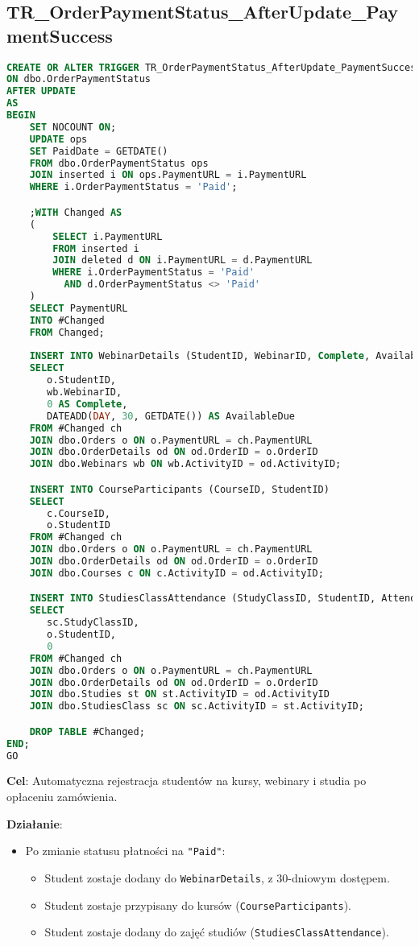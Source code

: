 \documentclass[12pt]{article}
\begin{document}
\newpage
\subsection{TR\_OrderPaymentStatus\_AfterUpdate\_PaymentSuccess}

\begin{lstlisting}[language=SQL]
CREATE OR ALTER TRIGGER TR_OrderPaymentStatus_AfterUpdate_PaymentSuccess
ON dbo.OrderPaymentStatus
AFTER UPDATE
AS
BEGIN
    SET NOCOUNT ON;
    UPDATE ops
    SET PaidDate = GETDATE()
    FROM dbo.OrderPaymentStatus ops
    JOIN inserted i ON ops.PaymentURL = i.PaymentURL
    WHERE i.OrderPaymentStatus = 'Paid';

    ;WITH Changed AS
    (
        SELECT i.PaymentURL
        FROM inserted i
        JOIN deleted d ON i.PaymentURL = d.PaymentURL
        WHERE i.OrderPaymentStatus = 'Paid'
          AND d.OrderPaymentStatus <> 'Paid'
    )
    SELECT PaymentURL
    INTO #Changed
    FROM Changed;
    
    INSERT INTO WebinarDetails (StudentID, WebinarID, Complete, AvailableDue)
    SELECT
       o.StudentID,
       wb.WebinarID,
       0 AS Complete,
       DATEADD(DAY, 30, GETDATE()) AS AvailableDue
    FROM #Changed ch
    JOIN dbo.Orders o ON o.PaymentURL = ch.PaymentURL
    JOIN dbo.OrderDetails od ON od.OrderID = o.OrderID
    JOIN dbo.Webinars wb ON wb.ActivityID = od.ActivityID;

    INSERT INTO CourseParticipants (CourseID, StudentID)
    SELECT
       c.CourseID,
       o.StudentID
    FROM #Changed ch
    JOIN dbo.Orders o ON o.PaymentURL = ch.PaymentURL
    JOIN dbo.OrderDetails od ON od.OrderID = o.OrderID
    JOIN dbo.Courses c ON c.ActivityID = od.ActivityID;

    INSERT INTO StudiesClassAttendance (StudyClassID, StudentID, Attendance)
    SELECT
       sc.StudyClassID,
       o.StudentID,
       0 
    FROM #Changed ch
    JOIN dbo.Orders o ON o.PaymentURL = ch.PaymentURL
    JOIN dbo.OrderDetails od ON od.OrderID = o.OrderID
    JOIN dbo.Studies st ON st.ActivityID = od.ActivityID
    JOIN dbo.StudiesClass sc ON sc.ActivityID = st.ActivityID;

    DROP TABLE #Changed;
END;
GO
\end{lstlisting}

\noindent \textbf{Cel}: Automatyczna rejestracja studentów na kursy, webinary i studia po opłaceniu zamówienia.  

\noindent \textbf{Działanie}:  
\begin{itemize}
    \item Po zmianie statusu płatności na \texttt{"Paid"}:
    \begin{itemize}
        \item Student zostaje dodany do \texttt{WebinarDetails}, z 30-dniowym dostępem.
        \item Student zostaje przypisany do kursów (\texttt{CourseParticipants}).
        \item Student zostaje dodany do zajęć studiów (\texttt{StudiesClassAttendance}).
    \end{itemize}
\end{itemize}
\end{document}
